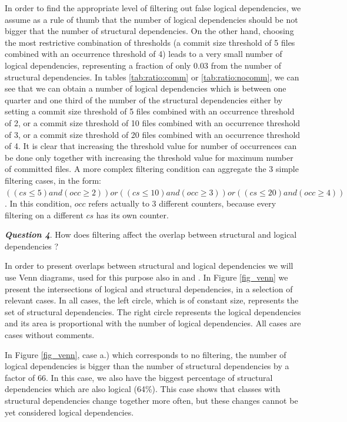 \documentclass[a4paper,twoside]{article}
\begin{document}
In order to find the appropriate level of filtering out false logical dependencies, we assume as a rule of thumb that the number of logical dependencies should be not bigger that the number of structural dependencies. On the other hand, choosing the most restrictive combination of thresholds (a commit size threshold of 5 files combined with an occurrence threshold of 4) leads to a very small number of logical dependencies, representing a fraction of only 0.03 from the number of structural dependencies. 
In tables \ref{tab:ratio:comm} or \ref{tab:ratio:nocomm}, we can see that we can obtain a number of logical dependencies which is between one quarter and one third of the number of the structural dependencies either by setting a commit size threshold of 5 files combined with an occurrence threshold of 2, or a commit size threshold of 10 files combined with an occurrence threshold of 3, or a commit size threshold of 20 files combined with an occurrence threshold of 4.  It is clear that increasing the threshold value for number of occurrences can be done only together with increasing the threshold value for maximum number of committed files. A more complex filtering condition can aggregate the 3 simple filtering cases, in the form: $((cs\leq 5) and (occ\geq 2)) or ((cs\leq 10) and (occ\geq 3)) or ((cs\leq 20) and (occ\geq 4))$. In this condition, $occ$ refers actually to 3 different counters, because every filtering on a different $cs$ has its own counter.  


\textit{\textbf{Question 4}}. How does filtering affect the overlap between structural and logical dependencies ? 

In order to present overlaps between structural and logical dependencies we will use Venn diagrams, used for this purpose also in \cite{Oliva:2011:ISL:2067853.2068086} and \cite{DBLP:journals/jss/AjienkaC17}. In Figure \ref{fig_venn} we present the intersections of logical and structural dependencies, in a selection of relevant cases. In all cases, the left circle, which is of constant size, represents the set of structural dependencies. The right circle represents the logical dependencies and its area is proportional with the number of logical dependencies. All cases are cases without comments.

In Figure \ref{fig_venn}, case a.) which corresponds to no filtering, the number of logical dependencies is bigger than the number of structural dependencies by a factor of 66. In this case, we also have the biggest percentage of structural dependencies which are also logical (64\%). This case shows that classes with structural dependencies change together more often, but these changes cannot be yet considered logical dependencies.
\end{document}
